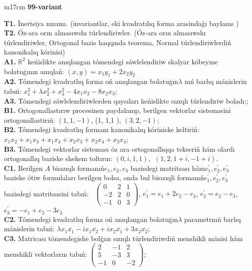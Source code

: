 \documentclass{article}
\begin{document}
\vspace{1cm}


\begin{tabular}{m{17cm}}
\textbf{99-variant}
\newline

\textbf{T1.} İnertsiya nızamı. (invariantlar,  eki kvadratılıq forma arasindaǵı baylanıs ) \\
\textbf{T2.} Óz-ara orın almasıwshı túrlendiriwler. (Óz-ara orın almasıwshı túrlendiriwler,  Ortogonal bazis haqqında teorema,  Normal túrlendiriwlerdiń kanonikalıq kórinisi) \\
\textbf{A1.} \(\mathbb{R}^{2}\) keńislikte anıqlangan tómendegi sáwlelendiriw skalyar kóbeyme bolatuģının anıqlań: \((x,y) = x_{1}y_{1} + 2x_{2}y_{2}\) \\
\textbf{A2.} Tómendegi kvadratlıq forma oń anıqlangan bolatuģın\(\lambda\) nıń barlıq mánislerin tabıń: \(x_{1}^{2} + \lambda x_{2}^{2} + x_{3}^{2} - 4x_{1}x_{2} - 8x_{2}x_{3}\); \\
\textbf{A3.} Tómendegi sáwlelendiriwlerden qaysıları keńislikte sızıqlı túrlendiriw boladı:; \\
\textbf{B1.} Ortogonallastırıw procesinen paydalanıp, berilgen vektorlar sistemasini ortogonallastirıń: \((1,1, - 1)\), (1, 1,1 ), \((3,2, - 1)\); \\
\textbf{B2.} Tómendegi kvadratlıq formanı kanonikalıq kóriniske keltiriń: \(x_{1}x_{2} + x_{1}x_{3} + x_{1}x_{4} + x_{2}x_{3} + x_{2}x_{4} + x_{3}x_{4}\); \\
\textbf{B3.} Tómendegi vektorlar sisteması óz ara ortogonallıqqa tekseriń hám olardı ortogonallıq baziske shekem toltırın: \((0,i,1,1),\ \ (1,2,1 + i, - 1 + i)\). \\
\textbf{C1.} Berilgen \(A\) bisızıqlı formanıń\(e_{1},e_{2},e_{3}\) bazisdegi matritsası hám\(e_{1}^{'},e_{2}^{'},e_{3}^{'}\) baziske ótiw formulaları berilgen bolsa, onda bul bisızıqli formanıń\(e_{1}^{'},e_{2}^{'},e_{3}^{'}\) bazisdegi matritsasini tabıń: \(\ \) \(\begin{pmatrix} 0 & 2 & 1 \\  - 2 & 2 & 0 \\  - 1 & 0 & 3 \end{pmatrix}\), \(e_{1}^{'} = e_{1} + 2e_{2} - e_{3}\), \(e_{2}^{'} = e_{2} - e_{3}\), \(e_{3}^{'} = - e_{1} + e_{2} - 3e_{3}\) \\
\textbf{C2.} Tómendegi kvadratlıq forma oń anıqlangan bolatuģın\(\lambda\) parametrnıń barlıq mánislerin tabıń: \(\lambda x_{1}\overline{x_{1}} - ix_{1}\overline{x_{2}} + ix_{2}\overline{x_{1}} + 3x_{2}\overline{x_{2}}\); \\
\textbf{C3.} Matricası tómendegishe bolǵan sızıqlı túrlendiriwdiń menshikli mánisi hám menshikli vektorların tabıń: \(\begin{pmatrix} 2 & - 1 & 2 \\ 5 & - 3 & 3 \\  - 1 & 0 & - 2 \end{pmatrix}\); \\

\end{tabular}
\vspace{1cm}
\end{document}
